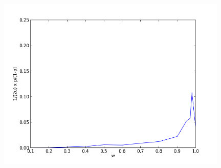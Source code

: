 \documentclass[11pt]{article}
\begin{document}
\includegraphics[width=11cm]{equation.png}
\end{document}
